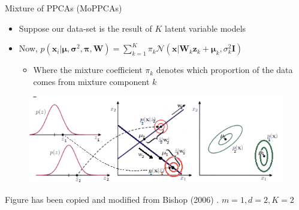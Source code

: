 \documentclass{beamer}
\begin{document}
\begin{frame}{Mixture of PPCAs (MoPPCAs)}
\begin{itemize}
    \item Suppose our data-set is the result of $K$ latent variable models
    \item Now, $p(\bm{x}_i|\bm{\mu}, \bm{\sigma}^2, \bm{\pi}, \bm{W}) = \sum^K_{k=1}\pi_k \mathcal{N}(\bm{x}|\bm{W}_k\bm{z}_k+\bm{\mu}_k, \sigma^2_k\bm{I})$
    \begin{itemize}
        \item Where the mixture coefficient $\pi_k$ denotes which proportion of the data comes from mixture component $k$
    \end{itemize}
\end{itemize}

\begin{figure}
    \centering
    \includegraphics[width=.8\textwidth]{moppcas.png}
\end{figure}
\footnotesize
Figure has been copied and modified from Bishop (2006) \cite{bishop2006pattern}. $m=1, d=2, K=2$
    
\end{frame}
\end{document}
